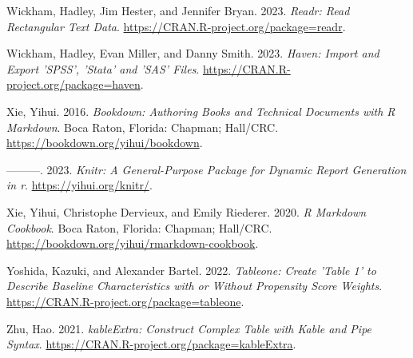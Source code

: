 \documentclass[
  letterpaper,
]{krantz}
\newlength{\cslhangindent}
\newenvironment{CSLReferences}[2] %
 {\begin{list}{}{%
  \setlength{\itemindent}{0pt}
  \setlength{\leftmargin}{0pt}
  \setlength{\parsep}{0pt}
  \ifodd #1
   \setlength{\leftmargin}{\cslhangindent}
   \setlength{\itemindent}{-1\cslhangindent}
  \fi
  \setlength{\itemsep}{#2\baselineskip}}}
 {\end{list}}
\begin{document}
\begin{CSLReferences}{1}{0}
Wickham, Hadley, Jim Hester, and Jennifer Bryan. 2023. \emph{Readr: Read
Rectangular Text Data}. \url{https://CRAN.R-project.org/package=readr}.

Wickham, Hadley, Evan Miller, and Danny Smith. 2023. \emph{Haven: Import
and Export 'SPSS', 'Stata' and 'SAS' Files}.
\url{https://CRAN.R-project.org/package=haven}.

Xie, Yihui. 2016. \emph{Bookdown: Authoring Books and Technical
Documents with {R} Markdown}. Boca Raton, Florida: Chapman; Hall/CRC.
\url{https://bookdown.org/yihui/bookdown}.

---------. 2023. \emph{Knitr: A General-Purpose Package for Dynamic
Report Generation in r}. \url{https://yihui.org/knitr/}.

Xie, Yihui, Christophe Dervieux, and Emily Riederer. 2020. \emph{R
Markdown Cookbook}. Boca Raton, Florida: Chapman; Hall/CRC.
\url{https://bookdown.org/yihui/rmarkdown-cookbook}.

Yoshida, Kazuki, and Alexander Bartel. 2022. \emph{Tableone: Create
'Table 1' to Describe Baseline Characteristics with or Without
Propensity Score Weights}.
\url{https://CRAN.R-project.org/package=tableone}.

Zhu, Hao. 2021. \emph{kableExtra: Construct Complex Table with Kable and
Pipe Syntax}. \url{https://CRAN.R-project.org/package=kableExtra}.

\end{CSLReferences}



\backmatter
\printindex
\end{document}
